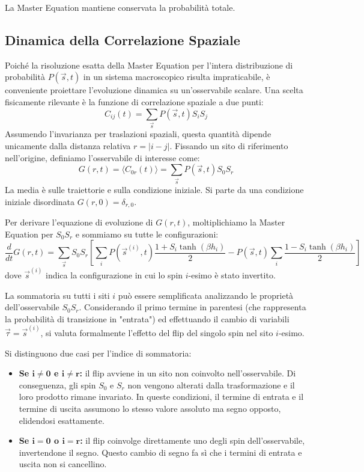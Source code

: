 La Master Equation mantiene conservata la probabilità totale.

\subsection{Dinamica della Correlazione Spaziale}
Poiché la risoluzione esatta della Master Equation per l'intera distribuzione di probabilità $P(\vec{s}, t)$ in un sistema macroscopico risulta impraticabile, è conveniente proiettare l'evoluzione dinamica su un'osservabile scalare. Una scelta fisicamente rilevante è la funzione di correlazione spaziale a due punti:
\begin{equation}
    C_{ij}(t) = \sum_{\vec{s}} P(\vec{s}, t) S_i S_j
\end{equation}
Assumendo l'invarianza per traslazioni spaziali, questa quantità dipende unicamente dalla distanza relativa $r = |i - j|$. Fissando un sito di riferimento nell'origine, definiamo l'osservabile di interesse come:
\begin{equation}
    G(r, t) = \langle C_{0r}(t) \rangle = \sum_{\vec{s}} P(\vec{s}, t) S_0 S_r
\end{equation}
La media è sulle traiettorie e sulla condizione iniziale. Si parte da una condizione iniziale disordinata $G(r, 0) = \delta_{r, 0}$.

Per derivare l'equazione di evoluzione di $G(r, t)$, moltiplichiamo la Master Equation per $S_0 S_r$ e sommiamo su tutte le configurazioni:
\begin{equation}
    \frac{d}{dt} G(r, t) = \sum_{\vec{s}} S_0 S_r \left[ \sum_{i} P(\vec{s}^{(i)}, t) \frac{1 + S_i \tanh(\beta h_i)}{2} - P(\vec{s}, t) \sum_{i} \frac{1 - S_i \tanh(\beta h_i)}{2} \right]
\end{equation}
dove $\vec{s}^{(i)}$ indica la configurazione in cui lo spin $i$-esimo è stato invertito.

La sommatoria su tutti i siti $i$ può essere semplificata analizzando le proprietà dell'osservabile $S_0 S_r$. Considerando il primo termine in parentesi (che rappresenta la probabilità di transizione in "entrata") ed effettuando il cambio di variabili $\vec{\tau} = \vec{s}^{(i)}$, si valuta formalmente l'effetto del flip del singolo spin nel sito $i$-esimo. 

Si distinguono due casi per l'indice di sommatoria:
\begin{itemize}
    \item \textbf{Se $\mathbf{i \neq 0}$ e $\mathbf{i \neq r}$:} il flip avviene in un sito non coinvolto nell'osservabile. Di conseguenza, gli spin $S_0$ e $S_r$ non vengono alterati dalla trasformazione e il loro prodotto rimane invariato. In queste condizioni, il termine di entrata e il termine di uscita assumono lo stesso valore assoluto ma segno opposto, elidendosi esattamente.
    \item \textbf{Se $\mathbf{i = 0}$ o $\mathbf{i = r}$:} il flip coinvolge direttamente uno degli spin dell'osservabile, invertendone il segno. Questo cambio di segno fa sì che i termini di entrata e uscita non si cancellino.
\end{itemize}

